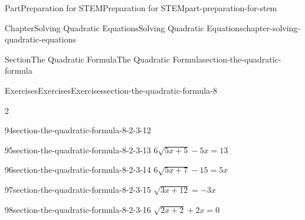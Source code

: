 \documentclass[twoside,10pt,]{book}
\numberwithin{equation}{section}
\begin{document}
\begin{partptx}{Part}{Preparation for STEM}{}{Preparation for STEM}{}{}{part-preparation-for-stem}
\begin{chapterptx}{Chapter}{Solving Quadratic Equations}{}{Solving Quadratic Equations}{}{}{chapter-solving-quadratic-equations}
\begin{sectionptx}{Section}{The Quadratic Formula}{}{The Quadratic Formula}{}{}{section-the-quadratic-formula}
\begin{exercises-subsection}{Exercises}{Exercises}{}{Exercises}{}{}{section-the-quadratic-formula-8}
\begin{exercisegroupcol}{2}
\begin{divisionexerciseegcol}{94}{}{}{section-the-quadratic-formula-8-2-3-12}
\end{divisionexerciseegcol}%
\begin{divisionexerciseegcol}{95}{}{}{section-the-quadratic-formula-8-2-3-13}%
\({6\sqrt{5x+5}-5x}={13}\)%
\end{divisionexerciseegcol}%
\begin{divisionexerciseegcol}{96}{}{}{section-the-quadratic-formula-8-2-3-14}%
\({6\sqrt{5x+7}-15}={5x}\)%
\end{divisionexerciseegcol}%
\begin{divisionexerciseegcol}{97}{}{}{section-the-quadratic-formula-8-2-3-15}%
\({\sqrt{3x+12}}={-3x}\)%
\end{divisionexerciseegcol}%
\begin{divisionexerciseegcol}{98}{}{}{section-the-quadratic-formula-8-2-3-16}%
\({\sqrt{2x+2}+2x}={0}\)%
\end{divisionexerciseegcol}%
\end{exercisegroupcol}
\par\medskip\noindent

\end{exercises-subsection}
\end{sectionptx}
\end{chapterptx}
\end{partptx}
\end{document}
